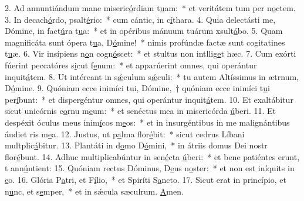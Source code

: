 2. Ad annuntiándum mane miseric\uline{ó}rdiam t\uline{u}am:~* et veritátem tum per n\uline{o}ctem.
3. In decach\uline{ó}rdo, psalt\uline{é}rio:~* cum cántic, in c\uline{í}thara.
4. Quia delectásti me, Dómine, in fact\uline{ú}ra t\uline{u}a:~* et in opéribus mánuum tuárum xsult\uline{á}bo.
5. Quam magnificáta sunt ópera t\uline{u}a, D\uline{ó}mine!~* nimis profúndæ factæ sunt cogitatines t\uline{u}æ.
6. Vir insípiens n\uline{o}n cogn\uline{ó}scet:~* et stultus non intllig\uline{e}t hæc.
7. Cum exórti fúerint peccatóres s\uline{i}cut f\uline{e}num:~* et apparúerint omnes, qui operántur inquit\uline{á}tem.
8. Ut intéreant in s\uline{ǽ}culum s\uline{ǽ}culi:~* tu autem Altíssimus in ætrnum, D\uline{ó}mine.
9. Quóniam ecce inimíci tui, Dómine,~† quóniam ecce inimíci t\uline{u}i per\uline{í}bunt:~* et dispergéntur omnes, qui operántur inquit\uline{á}tem.
10. Et exaltábitur sicut unicórnis c\uline{o}rnu m\uline{e}um:~* et senéctus mea in misericórda \uline{ú}beri.
11. Et despéxit óculus meus inim\uline{í}cos m\uline{e}os:~* et in insurgéntibus in me malignántibus áudiet ris m\uline{e}a.
12. Justus, ut p\uline{a}lma flor\uline{é}bit:~* sicut cedrus Líbani multplic\uline{á}bitur.
13. Plantáti in d\uline{o}mo D\uline{ó}mini,~* in átriis domus Dei nostr flor\uline{é}bunt.
14. Adhuc multiplicabúntur in sen\uline{é}cta \uline{ú}beri:~* et bene patiéntes erunt, t ann\uline{ú}ntient:
15. Quóniam rectus Dóminus, D\uline{e}us n\uline{o}ster:~* et non est iníquits in \uline{e}o.
16. Glória P\uline{a}tri, et F\uline{í}lio,~* et Spiríti S\uline{a}ncto.
17. Sicut erat in princípio, et n\uline{u}nc, et s\uline{e}mper,~* et in sǽcula sæculrum. \uline{A}men.
